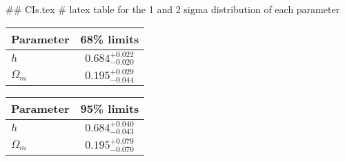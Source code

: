 ## CIs.tex
# latex table for the 1 and 2 sigma distribution of each parameter

\begin{tabular} { l  c}
 Parameter &  68\% limits\\
\hline
{\boldmath$h              $} & $0.684^{+0.022}_{-0.020}   $\\
{\boldmath$\Omega_m       $} & $0.195^{+0.029}_{-0.044}   $\\
\hline
\end{tabular}

\begin{tabular} { l  c}
 Parameter &  95\% limits\\
\hline
{\boldmath$h              $} & $0.684^{+0.040}_{-0.043}   $\\
{\boldmath$\Omega_m       $} & $0.195^{+0.079}_{-0.070}   $\\
\hline
\end{tabular}
